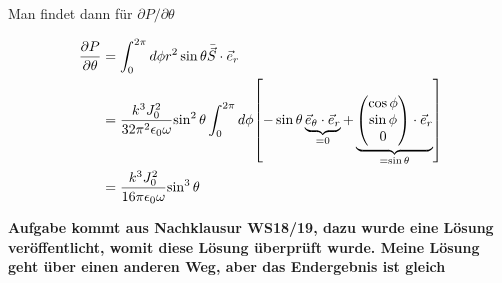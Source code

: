 \begin{enumerate}[label=\alph*)]
    Man findet dann für $\partial P/\partial \theta$

    \begin{equation}
      \begin{split}
        \pdv{P}{\theta}
        &=\int_0^{2\pi}d\phi r^2\sin\theta\bar{\vec S}\cdot\vec e_r\\
        &= \frac{k^3J_0^2}{32\pi^2\epsilon_0\omega} 
        {\sin^2\theta}
        \int_0^{2\pi}d\phi
        \qty[-\sin\theta \underbrace{\vec e_\theta\cdot\vec e_r}_{=0}+
        \underbrace{\begin{pmatrix}
          \cos\phi\\\sin\phi\\0
        \end{pmatrix}
        \cdot \vec e_r}_{=\sin\theta}
        ]\\
        &= \frac{k^3J_0^2}{16\pi\epsilon_0\omega} 
        {\sin^3\theta}
      \end{split}
    \end{equation}
    
  \vfill
  \textbf{Aufgabe kommt aus Nachklausur WS18/19, dazu wurde eine
  Lösung veröffentlicht, womit diese Lösung überprüft wurde. Meine
  Lösung geht über einen anderen Weg, aber das Endergebnis ist gleich}
\end{enumerate}


